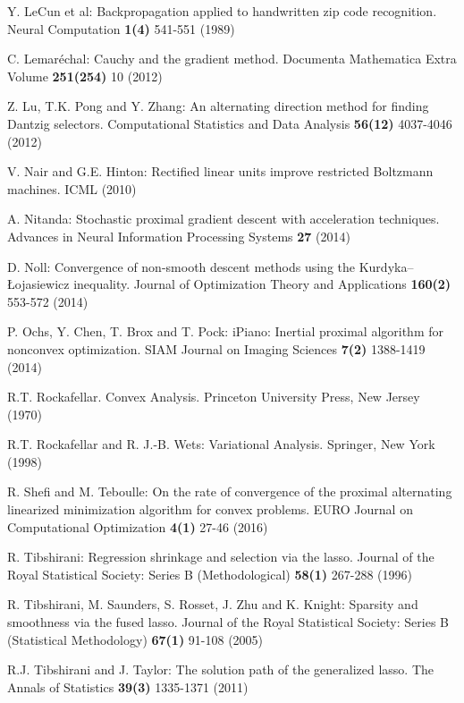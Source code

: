 \documentclass{svjour3}                %
\begin{document}
\begin{thebibliography}{10}
	Y. LeCun et al: Backpropagation applied to handwritten zip code recognition.
	\newblock Neural Computation
	\textbf{1(4)} 541-551 (1989)
	
	C. Lemaréchal: Cauchy and the gradient method. 
	\newblock Documenta Mathematica Extra Volume
	\textbf{251(254)}  10 (2012)
	
	Z. Lu, T.K. Pong and Y. Zhang: An alternating direction method for finding Dantzig selectors. 
	\newblock Computational Statistics and Data Analysis
	\textbf{56(12)} 4037-4046 (2012)
	
	V. Nair and G.E. Hinton: Rectified linear units improve restricted Boltzmann machines. 
	\newblock ICML (2010)
	
	A. Nitanda: Stochastic proximal gradient descent with acceleration techniques. \newblock Advances in Neural Information Processing Systems
	\textbf{27} (2014)
	
	D. Noll: Convergence of non-smooth descent methods using the Kurdyka–Łojasiewicz inequality.
	\newblock Journal of Optimization Theory and Applications
	\textbf{160(2)} 553-572 (2014)
	
	P. Ochs, Y. Chen, T. Brox and T. Pock: iPiano: Inertial proximal algorithm for nonconvex optimization.
	\newblock SIAM Journal on Imaging Sciences
	\textbf{7(2)} 1388-1419 (2014)
	
	R.T. Rockafellar. Convex Analysis. 
	\newblock Princeton University Press, New Jersey (1970)
	
	R.T. Rockafellar and R. J.-B. Wets: Variational Analysis. 
	\newblock Springer, New York (1998)
	
	R. Shefi and M. Teboulle: On the rate of convergence of the proximal alternating linearized minimization algorithm for convex problems. 
	\newblock EURO Journal on Computational Optimization
	\textbf{4(1)} 27-46 (2016)
	
	R. Tibshirani: Regression shrinkage and selection via the lasso.
	\newblock Journal of the Royal Statistical Society: Series B (Methodological)
	\textbf{58(1)} 267-288 (1996)
	
	R. Tibshirani, M. Saunders, S. Rosset, J. Zhu and K. Knight: Sparsity and smoothness via the fused lasso.
	\newblock Journal of the Royal Statistical Society: Series B (Statistical Methodology) 
	\textbf{67(1)} 91-108 (2005)
	
	R.J. Tibshirani and J. Taylor: The solution path of the generalized lasso.
	\newblock The Annals of Statistics
	\textbf{39(3)} 1335-1371 (2011)
	

\end{thebibliography}
\end{document}
